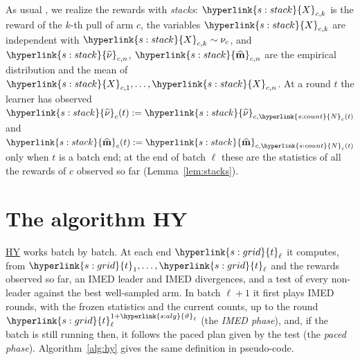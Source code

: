 \documentclass[10pt]{article}
\newcommand{\dt}[1]{\hypertarget{#1}{}}
\newcommand{\sy}[2]{{\hyperlink{#1}{#2}}}
\newcommand{\1}{\mathbf{1}}
\newcommand{\Ng}{\sy{s:count}{N}}
\newcommand{\hnu}{\sy{s:stack}{\widehat\nu}}
\newcommand{\hm}{\sy{s:stack}{\widehat{\mathbf m}}}
\newcommand{\Xs}{\sy{s:stack}{X}}
\newcommand{\tl}{\sy{s:grid}{t}}
\newcommand{\HY}{\hyperref[def:hy]{\textup{HY}}}
\newcommand{\thv}{\sy{s:alg}{\vartheta}}
\begin{document}
\begin{definition}\label{def:stacks}\dt{s:stack}
As usual \citep[Section~4.6]{LS}, we realize the rewards with \emph{stacks}: $\Xs_{c,k}$ is the reward of the
$k$-th pull of arm $c$, the variables $\Xs_{c,k}$ are independent with $\Xs_{c,k}\sim\nu_c$, and $\hnu_{c,n}$, $\hm_{c,n}$ are the empirical distribution and the mean of
$\Xs_{c,1},\dots,\Xs_{c,n}$. At a round $t$ the learner has observed $\hnu_c(t):=\hnu_{c,\Ng_c(t)}$ and $\hm_c(t):=\hm_{c,\Ng_c(t)}$ only when $t$ is a batch end; at the end of batch
$\ell$ these are the statistics of all the rewards of $c$ observed so far (Lemma~\ref{lem:stacks}).
\end{definition}

\section{The algorithm HY}\label{sec:algo}

\HY{} works batch by batch. At each end $\tl_\ell$ it computes, from $\tl_1,\dots,\tl_\ell$ and the rewards observed so far, an IMED leader and IMED divergences, and a
test of every non-leader against the best well-sampled arm. In batch $\ell+1$ it first plays IMED rounds, with the frozen statistics and the current counts, up to the round
$\tl_\ell^{1+\thv_\ell}$ (the \emph{IMED phase}), and, if the batch is still running then, it follows the paced plan given by the test (the \emph{paced phase}).
Algorithm~\ref{alg:hy} gives the same definition in pseudo-code.
\end{document}
